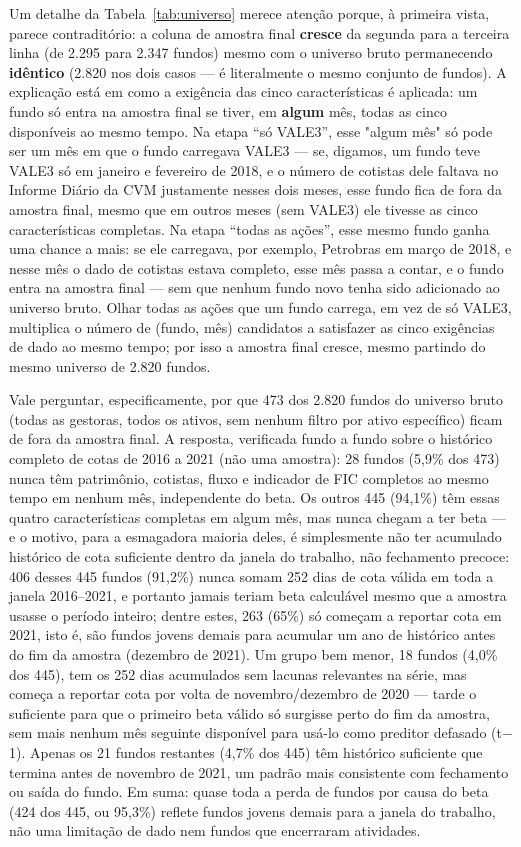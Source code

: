 \documentclass[11pt,a4paper]{article}
\begin{document}
Um detalhe da Tabela~\ref{tab:universo} merece atenção porque, à primeira vista, parece
contraditório: a coluna de amostra final \textbf{cresce} da segunda para a terceira linha (de
2.295 para 2.347 fundos) mesmo com o universo bruto permanecendo \textbf{idêntico} (2.820 nos
dois casos --- é literalmente o mesmo conjunto de fundos). A explicação está em como a exigência
das cinco características é aplicada: um fundo só entra na amostra final se tiver, em
\textbf{algum} mês, todas as cinco disponíveis ao mesmo tempo. Na etapa ``só VALE3'', esse "algum
mês" só pode ser um mês em que o fundo carregava VALE3 --- se, digamos, um fundo teve VALE3 só em
janeiro e fevereiro de 2018, e o número de cotistas dele faltava no Informe Diário da CVM
justamente nesses dois meses, esse fundo fica de fora da amostra final, mesmo que em outros meses
(sem VALE3) ele tivesse as cinco características completas. Na etapa ``todas as ações'', esse
mesmo fundo ganha uma chance a mais: se ele carregava, por exemplo, Petrobras em março de 2018, e
nesse mês o dado de cotistas estava completo, esse mês passa a contar, e o fundo entra na amostra
final --- sem que nenhum fundo novo tenha sido adicionado ao universo bruto. Olhar todas as ações
que um fundo carrega, em vez de só VALE3, multiplica o número de (fundo, mês) candidatos a
satisfazer as cinco exigências de dado ao mesmo tempo; por isso a amostra final cresce, mesmo
partindo do mesmo universo de 2.820 fundos.

Vale perguntar, especificamente, por que 473 dos 2.820 fundos do universo bruto (todas as
gestoras, todos os ativos, sem nenhum filtro por ativo específico) ficam de fora da amostra
final. A resposta, verificada fundo a fundo sobre o histórico completo de cotas de 2016 a 2021
(não uma amostra): 28 fundos (5,9\% dos 473) nunca têm patrimônio, cotistas, fluxo e indicador
de FIC completos ao mesmo tempo em nenhum mês, independente do beta. Os outros 445 (94,1\%) têm
essas quatro características completas em algum mês, mas nunca chegam a ter beta --- e o motivo,
para a esmagadora maioria deles, é simplesmente não ter acumulado histórico de cota suficiente
dentro da janela do trabalho, não fechamento precoce: 406 desses 445 fundos (91,2\%) nunca somam
252 dias de cota válida em toda a janela 2016--2021, e portanto jamais teriam beta calculável
mesmo que a amostra usasse o período inteiro; dentre estes, 263 (65\%) só começam a reportar
cota em 2021, isto é, são fundos jovens demais para acumular um ano de histórico antes do fim da
amostra (dezembro de 2021). Um grupo bem menor, 18 fundos (4,0\% dos 445), tem os 252 dias
acumulados sem lacunas relevantes na série, mas começa a reportar cota por volta de
novembro/dezembro de 2020 --- tarde o suficiente para que o primeiro beta válido só surgisse
perto do fim da amostra, sem mais nenhum mês seguinte disponível para usá-lo como preditor
defasado (t$-$1). Apenas os 21 fundos restantes (4,7\% dos 445) têm histórico suficiente que
termina antes de novembro de 2021, um padrão mais consistente com fechamento ou saída do fundo.
Em suma: quase toda a perda de fundos por causa do beta (424 dos 445, ou 95,3\%) reflete fundos
jovens demais para a janela do trabalho, não uma limitação de dado nem fundos que encerraram
atividades.
\end{document}
